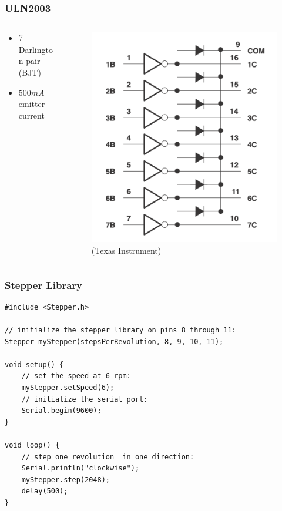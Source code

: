 \documentclass[compress, aspectratio=32]{beamer}
\begin{document}
\begin{frame}
    \frametitle{ULN2003}
    \begin{columns}
        \begin{column}{0.5\textwidth}
            \begin{itemize}
                \item 7 Darlington pair (BJT)
                \item $500mA$ emitter current
            \end{itemize}
        \end{column}
        \begin{column}{0.5\textwidth}
            \begin{figure}
                \centering
                \includegraphics[height=0.7\textheight]{uln2003.png}
                \caption*{(Texas Instrument)}
            \end{figure}
        \end{column}
    \end{columns}
\end{frame}

\begin{frame}[fragile]
    \frametitle{Stepper Library}
    \begin{lstlisting}
#include <Stepper.h>

// initialize the stepper library on pins 8 through 11:
Stepper myStepper(stepsPerRevolution, 8, 9, 10, 11);

void setup() {
    // set the speed at 6 rpm:
    myStepper.setSpeed(6);
    // initialize the serial port:
    Serial.begin(9600);
}

void loop() {
    // step one revolution  in one direction:
    Serial.println("clockwise");
    myStepper.step(2048);
    delay(500);
}
    \end{lstlisting}
\end{frame}
\end{document}
